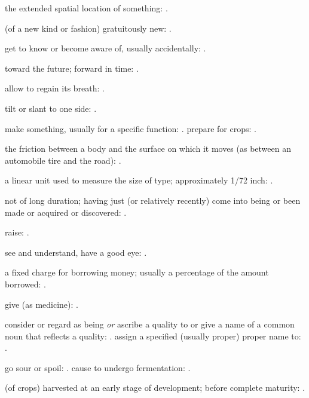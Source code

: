   the extended spatial location of something:   .

  (of a new kind or fashion) gratuitously new:   .

  get to know or become aware of, usually accidentally:   .

  toward the future; forward in time:   .

  allow to regain its breath: .

  tilt or slant to one side: .

  make something, usually for a specific function:   . prepare for crops:   .

  the friction between a body and the surface on which it moves (as between an automobile tire and the road):   .

  a linear unit used to measure the size of type; approximately 1/72 inch: .

  not of long duration; having just (or relatively recently) come into being or been made or acquired or discovered: .

  raise: .

  see and understand, have a good eye: .

  a fixed charge for borrowing money; usually a percentage of the amount borrowed: .

  give (as medicine): .

  consider or regard as being \textit{or} ascribe a quality to or give a name of a common noun that reflects a quality: . assign a specified (usually proper) proper name to:   .

  go sour or spoil:   . cause to undergo fermentation:   .

  (of crops) harvested at an early stage of development; before complete maturity:   .

